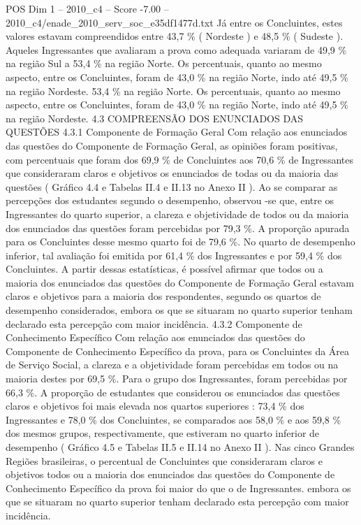 \begin{textsample}{POS Dim 1 – 2010\_c4 – Score -7.00 – 2010\_c4/enade\_2010\_serv\_soc\_e35df1477d.txt}
Já entre os Concluintes, estes valores estavam compreendidos entre 43,7 \% ( Nordeste ) e 48,5 \% ( Sudeste ).
Aqueles Ingressantes que avaliaram a prova como adequada variaram de 49,9 \% na região Sul a 53,4 \% na região Norte.
Os percentuais, quanto ao mesmo aspecto, entre os Concluintes, foram de 43,0 \% na região Norte, indo até 49,5 \% na região Nordeste. 53,4 \% na região Norte.
Os percentuais, quanto ao mesmo aspecto, entre os Concluintes, foram de 43,0 \% na região Norte, indo até 49,5 \% na região Nordeste. 4.3 COMPREENSÃO DOS ENUNCIADOS DAS QUESTÕES 4.3.1 Componente de Formação Geral Com relação aos enunciados das questões do Componente de Formação Geral, as opiniões foram positivas, com percentuais que foram dos 69,9 \% de Concluintes aos 70,6 \% de Ingressantes que consideraram claros e objetivos os enunciados de todas ou da maioria das questões ( Gráfico 4.4 e Tabelas II.4 e II.13 no Anexo II ).
Ao se comparar as percepções dos estudantes segundo o desempenho, observou -se que, entre os Ingressantes do quarto superior, a clareza e objetividade de todos ou da maioria dos enunciados das questões foram percebidas por 79,3 \%.
A proporção apurada para os Concluintes desse mesmo quarto foi de 79,6 \%.
No quarto de desempenho inferior, tal avaliação foi emitida por 61,4 \% dos Ingressantes e por 59,4 \% dos Concluintes.
A partir dessas estatísticas, é possível afirmar que todos ou a maioria dos enunciados das questões do Componente de Formação Geral estavam claros e objetivos para a maioria dos respondentes, segundo os quartos de desempenho considerados, embora os que se situaram no quarto superior tenham declarado esta percepção com maior incidência. 4.3.2 Componente de Conhecimento Específico Com relação aos enunciados das questões do Componente de Conhecimento Específico da prova, para os Concluintes da Área de Serviço Social, a clareza e a objetividade foram percebidas em todos ou na maioria destes por 69,5 \%.
Para o grupo dos Ingressantes, foram percebidas por 66,3 \%.
A proporção de estudantes que considerou os enunciados das questões claros e objetivos foi mais elevada nos quartos superiores : 73,4 \% dos Ingressantes e 78,0 \% dos Concluintes, se comparados aos 58,0 \% e aos 59,8 \% dos mesmos grupos, respectivamente, que estiveram no quarto inferior de desempenho ( Gráfico 4.5 e Tabelas II.5 e II.14 no Anexo II ).
Nas cinco Grandes Regiões brasileiras, o percentual de Concluintes que consideraram claros e objetivos todos ou a maioria dos enunciados das questões do Componente de Conhecimento Específico da prova foi maior do que o de Ingressantes. embora os que se situaram no quarto superior tenham declarado esta percepção com maior incidência.

\end{textsample}

